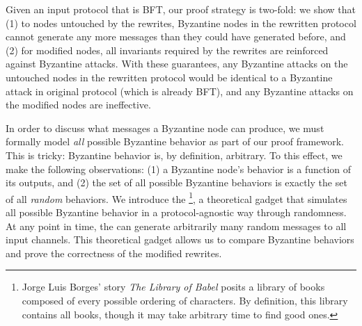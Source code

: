Given an input protocol that is BFT, our proof strategy is two-fold: we show that (1) to nodes untouched by the rewrites, Byzantine nodes in the rewritten protocol cannot generate any more messages than they could have generated before, and
(2) for modified nodes, all invariants required by the rewrites are reinforced against Byzantine attacks.
With these guarantees, any Byzantine attacks on the untouched nodes in the rewritten protocol would be identical to a Byzantine attack in original protocol (which is already BFT), and any Byzantine attacks on the modified nodes are ineffective.

In order to discuss what messages a Byzantine node can produce, we must formally model \emph{all} possible Byzantine behavior as part of our proof framework.
This is tricky: Byzantine behavior is, by definition, arbitrary.
To this effect, we make the following observations: (1) a Byzantine node's behavior is a function of its outputs, and (2) the set of all possible Byzantine behaviors is 
exactly the set of all \emph{random} behaviors.
We introduce the \emph{\randomSimulator{}}\footnote{Jorge Luis Borges' story \textit{The Library of Babel} posits a library of books composed of every possible ordering of characters. By definition, this library contains all books, though it may take arbitrary time to find good ones.}, a theoretical gadget that simulates all possible Byzantine behavior in a protocol-agnostic way through randomness.
At any point in time, the \randomSimulator{} can generate arbitrarily many random messages to all input channels.
This theoretical gadget allows us to compare Byzantine behaviors and prove the correctness of the modified rewrites.

